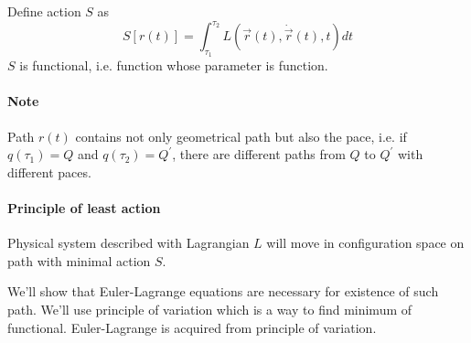 Define action $S$ as
$$S\left[r(t)\right] = \int_{\tau_1}^{\tau_2} L(\vec{r}(t), \dot{\vec{r}}(t),t) dt$$
$S$ is functional, i.e. function whose parameter is function.
\paragraph{Note} Path $r(t)$ contains not only geometrical path but also the pace, i.e. if $q(\tau_1) = Q$ and $q(\tau_2)=Q^\prime$, there are different paths from $Q$ to $Q^\prime$ with different paces.
\paragraph{Principle of least action} Physical system described with Lagrangian $L$ will move in configuration space on path with minimal action $S$.

We'll show that Euler-Lagrange equations are necessary for existence of such path. We'll use principle of variation which is a way to find minimum of functional. Euler-Lagrange is acquired from principle of variation.
